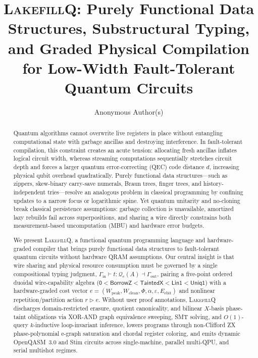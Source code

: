 \documentclass[acmsmall,screen,anonymous]{acmart}
\DeclareRobustCommand{\_}{\ifmmode\text{\char95}\else\char95\penalty0\relax\fi}
\theoremstyle{plain}
\newcommand{\LakefillQ}{\textsc{LakefillQ}}
\newcommand{\CapZero}{\ensuremath{\mathsf{0}}}
\newcommand{\CapBorrowZ}{\ensuremath{\mathsf{BorrowZ}}}
\newcommand{\CapTaintedX}{\ensuremath{\mathsf{TaintedX}}}
\newcommand{\CapLin}{\ensuremath{\mathsf{Lin1}}}
\newcommand{\CapUniq}{\ensuremath{\mathsf{Uniq1}}}
\begin{document}
\title[\LakefillQ{}: Purely Functional Data Structures for Low-Width Quantum Circuits]{\LakefillQ{}: Purely Functional Data Structures, Substructural Typing, and Graded Physical Compilation for Low-Width Fault-Tolerant Quantum Circuits}

\author{Anonymous Author(s)}

\begin{abstract}
Quantum algorithms cannot overwrite live registers in place without entangling computational state with garbage ancillas and destroying interference. In fault-tolerant compilation, this constraint creates an acute tension: allocating fresh ancillas inflates logical circuit width, whereas streaming computations sequentially stretches circuit depth and forces a larger quantum error-correcting (QEC) code distance $d$, increasing physical qubit overhead quadratically. Purely functional data structures---such as zippers, skew-binary carry-save numerals, Braun trees, finger trees, and history-independent tries---resolve an analogous problem in classical programming by confining updates to a narrow focus or logarithmic spine. Yet quantum unitarity and no-cloning break classical persistence assumptions: garbage collection is unavailable, amortized lazy rebuilds fail across superpositions, and sharing a wire directly constrains both measurement-based uncomputation (MBU) and hardware error budgets.

We present \LakefillQ{}, a functional quantum programming language and hardware-graded compiler that brings purely functional data structures to fault-tolerant quantum circuits without hardware QRAM assumptions. Our central insight is that wire sharing and physical resource consumption must be governed by a single compositional typing judgment, $\Gamma_{\mathrm{in}} \vdash t : \mathcal{Q}_{e}(A) \dashv \Gamma_{\mathrm{out}}$, pairing a five-point ordered duoidal wire-capability algebra ($\CapZero < \CapBorrowZ < \CapTaintedX < \CapLin < \CapUniq$) with a hardware-graded cost vector $e = (W_{\mathrm{peak}}, W_{\mathrm{clean}}, \Phi, \alpha, \varepsilon, E_{\mathrm{ebit}})$ and nonlinear repetition/partition action $r \triangleright e$. Without user proof annotations, \LakefillQ{} discharges domain-restricted erasure, quotient canonicality, and bilinear $X$-basis phase-taint obligations via XOR-AND graph equivalence sweeping, SMT solving, and $O(1)$-query $k$-inductive loop-invariant inference, lowers programs through non-Clifford ZX phase-polynomial e-graph saturation and chordal register coloring, and emits dynamic OpenQASM~3.0 and Stim circuits across single-machine, parallel multi-QPU, and serial multishot regimes.


\end{abstract}
\end{document}
